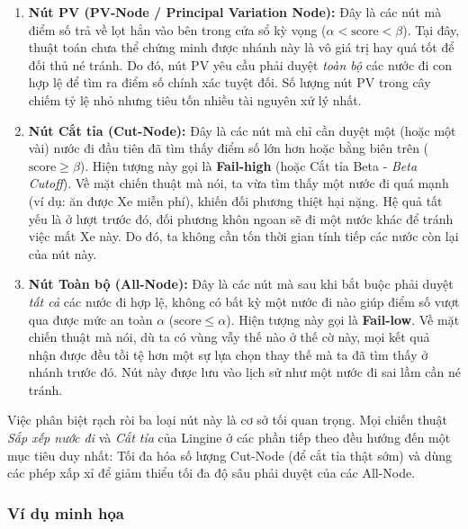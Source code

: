 \begin{enumerate}
    \item \textbf{Nút PV (PV-Node / Principal Variation Node):} 
    Đây là các nút mà điểm số trả về lọt hẳn vào bên trong cửa sổ kỳ vọng ($\alpha < \text{score} < \beta$). Tại đây, thuật toán chưa thể chứng minh được nhánh này là vô giá trị hay quá tốt để đối thủ né tránh. Do đó, nút PV yêu cầu phải duyệt \textit{toàn bộ} các nước đi con hợp lệ để tìm ra điểm số chính xác tuyệt đối. Số lượng nút PV trong cây chiếm tỷ lệ nhỏ nhưng tiêu tốn nhiều tài nguyên xử lý nhất.
    
    \item \textbf{Nút Cắt tỉa (Cut-Node):} 
    Đây là các nút mà chỉ cần duyệt một (hoặc một vài) nước đi đầu tiên đã tìm thấy điểm số lớn hơn hoặc bằng biên trên ($\text{score} \ge \beta$). Hiện tượng này gọi là \textbf{Fail-high} (hoặc Cắt tỉa Beta - \textit{Beta Cutoff}). Về mặt chiến thuật mà nói, ta vừa tìm thấy một nước đi quá mạnh (ví dụ: ăn được Xe miễn phí), khiến đối phương thiệt hại nặng. Hệ quả tất yếu là ở lượt trước đó, đối phương khôn ngoan sẽ đi một nước khác để tránh việc mất Xe này. Do đó, ta không cần tốn thời gian tính tiếp các nước còn lại của nút này.
    
    \item \textbf{Nút Toàn bộ (All-Node):} 
    Đây là các nút mà sau khi bắt buộc phải duyệt \textit{tất cả} các nước đi hợp lệ, không có bất kỳ một nước đi nào giúp điểm số vượt qua được mức an toàn $\alpha$ ($\text{score} \le \alpha$). Hiện tượng này gọi là \textbf{Fail-low}. Về mặt chiến thuật mà nói, dù ta có vùng vẫy thế nào ở thế cờ này, mọi kết quả nhận được đều tồi tệ hơn một sự lựa chọn thay thế mà ta đã tìm thấy ở nhánh trước đó. Nút này được lưu vào lịch sử như một nước đi sai lầm cần né tránh.
\end{enumerate}

Việc phân biệt rạch ròi ba loại nút này là cơ sở tối quan trọng. Mọi chiến thuật \textit{Sắp xếp nước đi} và \textit{Cắt tỉa} của Lingine ở các phần tiếp theo đều hướng đến một mục tiêu duy nhất: Tối đa hóa số lượng Cut-Node (để cắt tỉa thật sớm) và dùng các phép xấp xỉ để giảm thiểu tối đa độ sâu phải duyệt của các All-Node.

\subsubsection{Ví dụ minh họa}

